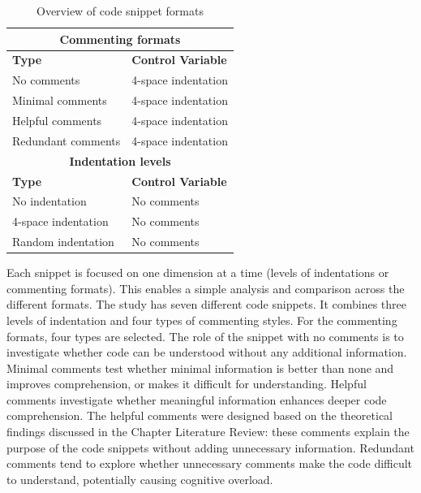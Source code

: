 \begin{table}[ht]
\centering
\small
\caption{Overview of code snippet formats}
\begin{tabular}{|p{6cm}|p{6cm}|}
\hline
\multicolumn{2}{|c|}{\rule{0pt}{1.2em}\textbf{Commenting formats}} \\[0.5em]
\hline
\rule{0pt}{1.2em}\textbf{Type} & \textbf{Control Variable} \\[0.5em]
\hline 
\rule{0pt}{1.2em}No comments & 4-space indentation \\[0.5em]
\hline
\rule{0pt}{1.2em}Minimal comments & 4-space indentation \\[0.5em]
\hline
\rule{0pt}{1.2em}Helpful comments & 4-space indentation \\[0.5em]
\hline
\rule{0pt}{1.2em}Redundant comments & 4-space indentation \\[0.5em]
\hline
\multicolumn{2}{|c|}{\rule{0pt}{1.2em}\textbf{Indentation levels}} \\[0.5em]
\hline
\rule{0pt}{1.2em}\textbf{Type} & \textbf{Control Variable} \\[0.5em]
\hline
\rule{0pt}{1.2em}No indentation & No comments \\[0.5em]
\hline
\rule{0pt}{1.2em}4-space indentation & No comments \\[0.5em]
\hline
\rule{0pt}{1.2em}Random indentation & No comments \\[0.5em]
\hline
\end{tabular}
\label{tab:snippet_control}
\end{table}



Each snippet is focused on one dimension at a time (levels of indentations or commenting formats). This enables a simple analysis and comparison across the different formats. The study has seven different code snippets. It combines three levels of indentation and four types of commenting styles. For the commenting formats, four types are selected.  The role of the snippet with no comments is to investigate whether code can be understood without any additional information.  Minimal comments test whether minimal information is better than none and improves comprehension, or makes it difficult for understanding.
Helpful comments investigate whether meaningful information enhances deeper code comprehension. The helpful comments were designed based on the theoretical findings discussed in the Chapter Literature Review: these comments explain the purpose of the code snippets without adding unnecessary information. Redundant comments tend to explore whether unnecessary comments make the code difficult to understand, potentially causing cognitive overload.


